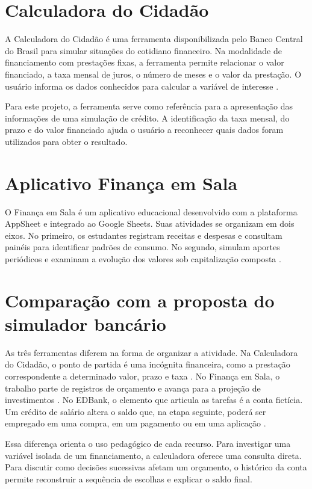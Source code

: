 \section{Calculadora do Cidadão} %
\label{cap-solucoes-calculadora}

A Calculadora do Cidadão é uma ferramenta disponibilizada pelo Banco Central do Brasil para simular situações do cotidiano financeiro. Na modalidade de financiamento com prestações fixas, a ferramenta permite relacionar o valor financiado, a taxa mensal de juros, o número de meses e o valor da prestação. O usuário informa os dados conhecidos para calcular a variável de interesse \cite{bcbCalculadora}.


Para este projeto, a ferramenta serve como referência para a apresentação das informações de uma simulação de crédito. A identificação da taxa mensal, do prazo e do valor financiado ajuda o usuário a reconhecer quais dados foram utilizados para obter o resultado.

\section{Aplicativo Finança em Sala} %
\label{cap-solucoes-aplicativo}

O Finança em Sala é um aplicativo educacional desenvolvido com a
plataforma AppSheet e integrado ao Google Sheets. Suas atividades
se organizam em dois eixos. No primeiro, os estudantes registram
receitas e despesas e consultam painéis para identificar padrões
de consumo. No segundo, simulam aportes periódicos e examinam a
evolução dos valores sob capitalização composta
\cite{limaBatista2026}.

\section{Comparação com a proposta do simulador bancário} %
\label{cap-solucoes-comparacao}

As três ferramentas diferem na forma de organizar a atividade.
Na Calculadora do Cidadão, o ponto de partida é uma incógnita
financeira, como a prestação correspondente a determinado valor,
prazo e taxa \cite{bcbCalculadora}. No Finança em Sala, o trabalho
parte de registros de orçamento e avança para a projeção de
investimentos \cite{limaBatista2026}. No EDBank, o elemento que
articula as tarefas é a conta fictícia. Um crédito de salário
altera o saldo que, na etapa seguinte, poderá ser empregado em
uma compra, em um pagamento ou em uma aplicação
\cite{bravin2026edbank}.

Essa diferença orienta o uso pedagógico de cada recurso. Para
investigar uma variável isolada de um financiamento, a calculadora
oferece uma consulta direta. Para discutir como decisões sucessivas
afetam um orçamento, o histórico da conta permite reconstruir a
sequência de escolhas e explicar o saldo final.